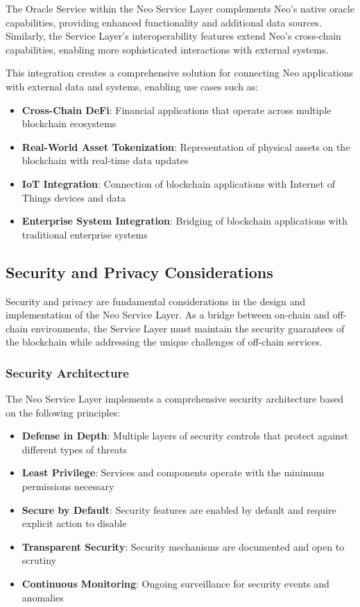 The Oracle Service within the Neo Service Layer complements Neo's native oracle capabilities, providing enhanced functionality and additional data sources. Similarly, the Service Layer's interoperability features extend Neo's cross-chain capabilities, enabling more sophisticated interactions with external systems.

This integration creates a comprehensive solution for connecting Neo applications with external data and systems, enabling use cases such as:

\begin{itemize}
    \item \textbf{Cross-Chain DeFi}: Financial applications that operate across multiple blockchain ecosystems
    \item \textbf{Real-World Asset Tokenization}: Representation of physical assets on the blockchain with real-time data updates
    \item \textbf{IoT Integration}: Connection of blockchain applications with Internet of Things devices and data
    \item \textbf{Enterprise System Integration}: Bridging of blockchain applications with traditional enterprise systems
\end{itemize}

\subsection{Security and Privacy Considerations}
\label{subsec:nsl-security}

Security and privacy are fundamental considerations in the design and implementation of the Neo Service Layer. As a bridge between on-chain and off-chain environments, the Service Layer must maintain the security guarantees of the blockchain while addressing the unique challenges of off-chain services.

\subsubsection{Security Architecture}
\label{subsubsec:security-architecture}

The Neo Service Layer implements a comprehensive security architecture based on the following principles:

\begin{itemize}
    \item \textbf{Defense in Depth}: Multiple layers of security controls that protect against different types of threats
    \item \textbf{Least Privilege}: Services and components operate with the minimum permissions necessary
    \item \textbf{Secure by Default}: Security features are enabled by default and require explicit action to disable
    \item \textbf{Transparent Security}: Security mechanisms are documented and open to scrutiny
    \item \textbf{Continuous Monitoring}: Ongoing surveillance for security events and anomalies
\end{itemize}


